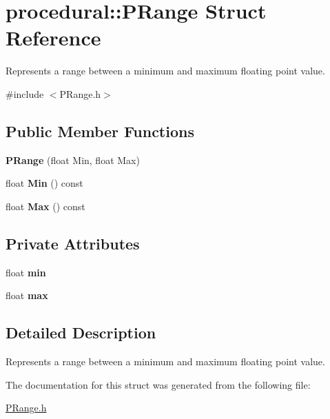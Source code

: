 \hypertarget{structprocedural_1_1_p_range}{\section{procedural\-:\-:P\-Range Struct Reference}
\label{structprocedural_1_1_p_range}
}


Represents a range between a minimum and maximum floating point value.  




{\ttfamily \#include $<$P\-Range.\-h$>$}

\subsection*{Public Member Functions}
\begin{DoxyCompactItemize}
\item 
\hypertarget{structprocedural_1_1_p_range_a99f52197ee6a6c10fb4903e920647f6c}{{\bfseries P\-Range} (float Min, float Max)}\label{structprocedural_1_1_p_range_a99f52197ee6a6c10fb4903e920647f6c}

\item 
\hypertarget{structprocedural_1_1_p_range_acfe90736a74accd1affa211115a1e880}{float {\bfseries Min} () const }\label{structprocedural_1_1_p_range_acfe90736a74accd1affa211115a1e880}

\item 
\hypertarget{structprocedural_1_1_p_range_a5bb2d09102101933e422e2dee6bd8106}{float {\bfseries Max} () const }\label{structprocedural_1_1_p_range_a5bb2d09102101933e422e2dee6bd8106}

\end{DoxyCompactItemize}
\subsection*{Private Attributes}
\begin{DoxyCompactItemize}
\item 
\hypertarget{structprocedural_1_1_p_range_a832fd307d8fd4c0cbaa2a954fdab9891}{float {\bfseries min}}\label{structprocedural_1_1_p_range_a832fd307d8fd4c0cbaa2a954fdab9891}

\item 
\hypertarget{structprocedural_1_1_p_range_a754dc4266829588724b76a54e02c08c4}{float {\bfseries max}}\label{structprocedural_1_1_p_range_a754dc4266829588724b76a54e02c08c4}

\end{DoxyCompactItemize}


\subsection{Detailed Description}
Represents a range between a minimum and maximum floating point value. 

The documentation for this struct was generated from the following file\-:\begin{DoxyCompactItemize}
\item 
\hyperlink{_p_range_8h}{P\-Range.\-h}\end{DoxyCompactItemize}
